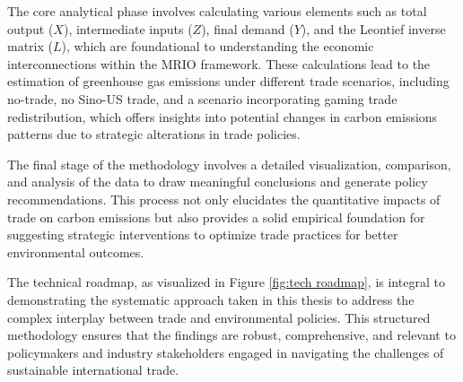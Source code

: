 The core analytical phase involves calculating various elements such as total output ($X$), intermediate inputs ($Z$), final demand ($Y$), and the Leontief inverse matrix ($L$), which are foundational to understanding the economic interconnections within the MRIO framework. These calculations lead to the estimation of greenhouse gas emissions under different trade scenarios, including no-trade, no Sino-US trade, and a scenario incorporating gaming trade redistribution, which offers insights into potential changes in carbon emissions patterns due to strategic alterations in trade policies.

The final stage of the methodology involves a detailed visualization, comparison, and analysis of the data to draw meaningful conclusions and generate policy recommendations. This process not only elucidates the quantitative impacts of trade on carbon emissions but also provides a solid empirical foundation for suggesting strategic interventions to optimize trade practices for better environmental outcomes.

The technical roadmap, as visualized in Figure \ref{fig:tech roadmap}, is integral to demonstrating the systematic approach taken in this thesis to address the complex interplay between trade and environmental policies. This structured methodology ensures that the findings are robust, comprehensive, and relevant to policymakers and industry stakeholders engaged in navigating the challenges of sustainable international trade.